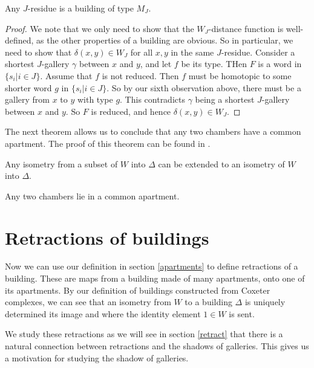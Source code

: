 \documentclass[11pt]{article}
\begin{document}
\begin{theorem}
    Any $J$-residue is a building of type $M_J$. 
\end{theorem}

\begin{proof}
    We note that we only need to show that the $W_J$-distance function is well-defined, as the other properties of a building are obvious. So in particular, we need to show that $\delta(x,y)\in W_J$ for all $x,y$ in the same $J$-residue. Consider a shortest $J$-gallery $\gamma$ between $x$ and $y$, and let $f$ be its type. THen $F$ is a word in $\{s_i|i\in J\}$. Assume that $f$ is not reduced. Then $f$ must be homotopic to some shorter word $g$ in $\{s_i|i\in J\}$. So by our sixth observation above, there must be a gallery from $x$ to $y$ with type $g$. This contradicts $\gamma$ being a shortest $J$-gallery between $x$ and $y$. So $F$ is reduced, and hence $\delta(x,y)\in W_J$. 
\end{proof}


The next theorem allows us to conclude that any two chambers have a common apartment. The proof of this theorem can be found in \cite[p.31]{RON}.

\begin{theorem}\label{isometry}
   Any isometry from a subset of $W$ into $\Delta$ can be extended to an isometry of $W$ into $\Delta$.
\end{theorem}


\begin{corollary}
    Any two chambers lie in a common apartment.
\end{corollary}


\section{Retractions of buildings}

Now we can use our definition in section \ref{apartments} to define retractions of a building. These are maps from a building made of many apartments, onto one of its apartments. By our definition of buildings constructed from Coxeter complexes, we can see that an isometry from $W$ to a building $\Delta$ is uniquely determined its image and where the identity element $1\in W$ is sent. 

We study these retractions as we will see in section \ref{retract} that there is a natural connection between retractions and the shadows of galleries. This gives us a motivation for studying the shadow of galleries. 
\end{document}
